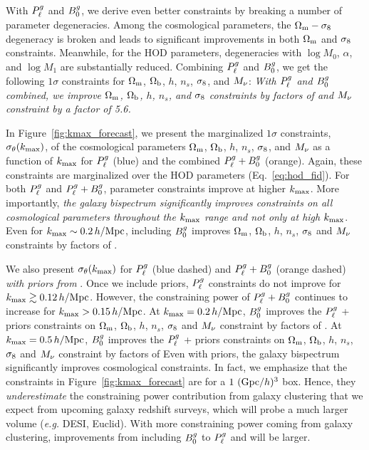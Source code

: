 With $P^g_{\ell}$ and $B^g_0$, we derive even better constraints by breaking a number
of parameter degeneracies. Among the cosmological parameters, the $\Omega_{\rm m}-\sigma_8$ 
degeneracy is broken and leads to significant improvements in both $\Omega_{\rm m}$ and 
$\sigma_8$ constraints. Meanwhile, for the HOD parameters, degeneracies with 
$\log M_0$, $\alpha$, and $\log M_1$ are substantially reduced. 
Combining $P^g_{\ell}$ and $B^g_0$, we get the following $1\sigma$ constraints for 
 $\Omega_{\rm m}$, $\Omega_{\rm b}$, $h$, $n_s$, $\sigma_8$, and $M_\nu$: 
{\em With $P^g_{\ell}$ and $B^g_0$ combined, we improve $\Omega_{\rm m}$, $\Omega_{\rm b}$, $h$,
$n_s$, and $\sigma_8$ constraints by factors of 
and $M_\nu$ constraint by a factor of 5.6.}

In Figure~\ref{fig:kmax_forecast}, we present the marginalized $1\sigma$
constraints, $\sigma_\theta(k_{\rm max})$, of the cosmological parameters $\Omega_{\rm m}$,
$\Omega_{\rm b}$, $h$, $n_s$, $\sigma_8$, and $M_\nu$ as a function of $k_{\rm max}$ for $P^g_{\ell}$
(blue) and the combined $P^g_{\ell} + B^g_0$ (orange). Again, these constraints are
marginalized over the \cite{zheng2007} HOD parameters (Eq.~\ref{eq:hod_fid}). 
For both $P^g_{\ell}$ and $P^g_{\ell} + B^g_0$, parameter constraints improve at higher
$k_{\rm max}$. More importantly, {\em the galaxy bispectrum significantly 
improves constraints on all cosmological parameters throughout the $k_{\rm max}$
range and not only at high $k_{\rm max}$}. Even for $k_{\rm max}\sim 0.2\,h/\mathrm{Mpc}$, including 
$B^g_0$ improves $\Omega_{\rm m}$, $\Omega_{\rm b}$, $h$, $n_s$, $\sigma_8$ and $M_\nu$ constraints by 
factors of 
.

We also present $\sigma_\theta(k_{\rm max})$ for $P^g_{\ell}$ (blue dashed) and $P^g_{\ell} + B^g_0$ 
(orange dashed) {\em with priors from \planck}. Once we include \planck priors,
$P^g_{\ell}$ constraints do not improve for $k_{\rm max} \gtrsim 0.12\,h/\mathrm{Mpc}$. However, the 
constraining power of $P^g_{\ell} + B^g_0$ continues to increase for $k_{\rm max} > 0.15\,h/\mathrm{Mpc}$. 
At $k_{\rm max}=0.2\,h/\mathrm{Mpc}$, $B^g_0$ improves the $P^g_{\ell}$ + \planck priors constraints on  
$\Omega_{\rm m}$, $\Omega_{\rm b}$, $h$, $n_s$, $\sigma_8$ and $M_\nu$ constraint by factors of
.
At $k_{\rm max} = 0.5\,h/\mathrm{Mpc}$, $B^g_0$ improves the $P^g_{\ell}$ + \planck priors constraints on  
$\Omega_{\rm m}$, $\Omega_{\rm b}$, $h$, $n_s$, $\sigma_8$ and $M_\nu$ constraint by factors of 
Even with \planck priors, the galaxy bispectrum significantly improves cosmological 
constraints. In fact, we emphasize that the constraints in Figure~\ref{fig:kmax_forecast} 
are for a $1~({\rm Gpc}/h)^3$ box. Hence, they {\em underestimate} the 
constraining power contribution from galaxy clustering that we expect from upcoming
galaxy redshift surveys, which will probe a much larger volume (\emph{e.g.} DESI, Euclid). 
With more constraining power coming from galaxy clustering, improvements from
including $B^g_0$ to $P^g_{\ell}$ and \planck will be larger. 


